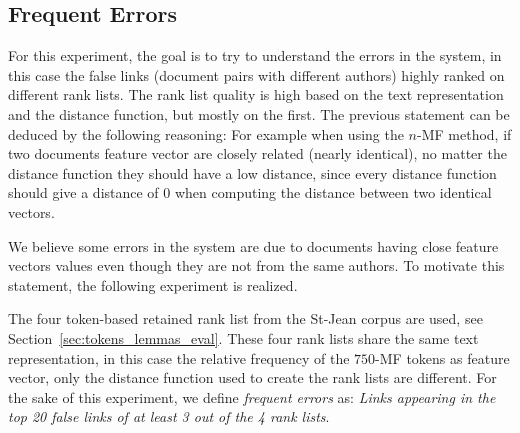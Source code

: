 \begin{table}
  \vspace{0.5cm}

  \label{tab:gain_750_mf}
\end{table}

\subsection{Frequent Errors \label{sec:frequent_errors}}

For this experiment, the goal is to try to understand the errors in the system, in this case the false links (document pairs with different authors) highly ranked on different rank lists.
The rank list quality is high based on the text representation and the distance function, but mostly on the first.
The previous statement can be deduced by the following reasoning: For example when using the $n$-MF method, if two documents feature vector are closely related (nearly identical), no matter the distance function they should have a low distance, since every distance function should give a distance of 0 when computing the distance between two identical vectors.

We believe some errors in the system are due to documents having close feature vectors values even though they are not from the same authors.
To motivate this statement, the following experiment is realized.

The four token-based retained rank list from the St-Jean corpus are used, see Section~\ref{sec:tokens_lemmas_eval}.
These four rank lists share the same text representation, in this case the relative frequency of the $750$-MF tokens as feature vector, only the distance function used to create the rank lists are different.
For the sake of this experiment, we define \textit{frequent errors} as: \textit{Links appearing in the top 20 false links of at least 3 out of the 4 rank lists}.

